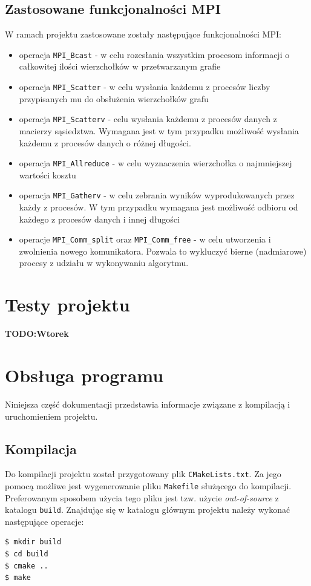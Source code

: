 \documentclass[12pt]{article}
\begin{document}
\subsection{Zastosowane funkcjonalności MPI}
W ramach projektu zastosowane zostały następujące funkcjonalności MPI:
\begin{itemize}
\item operacja \lstinline{MPI_Bcast} - w celu rozesłania wszystkim procesom informacji o całkowitej ilości wierzchołków w przetwarzanym grafie
\item operacja \lstinline{MPI_Scatter} - w celu wysłania każdemu z procesów liczby przypisanych mu do obsłużenia wierzchołków grafu
\item operacja \lstinline{MPI_Scatterv} - celu wysłania każdemu z procesów danych z macierzy sąsiedztwa. Wymagana jest w tym przypadku możliwość wysłania każdemu z procesów danych o różnej długości.
\item operacja \lstinline{MPI_Allreduce} - w celu wyznaczenia wierzchołka o najmniejszej wartości kosztu
\item operacja \lstinline{MPI_Gatherv} - w celu zebrania wyników wyprodukowanych przez każdy z procesów. W tym przypadku wymagana jest możliwość odbioru od każdego z procesów danych i innej długości
\item operacje \lstinline{MPI_Comm_split} oraz \lstinline{MPI_Comm_free} - w celu utworzenia i zwolnienia nowego komunikatora. Pozwala to wykluczyć bierne (nadmiarowe) procesy z udziału w wykonywaniu algorytmu.
\end{itemize}

\section{Testy projektu}
\textbf{TODO:Wtorek}

\newpage
\section{Obsługa programu}
Niniejsza część dokumentacji przedstawia informacje związane z kompilacją i uruchomieniem projektu.

\subsection{Kompilacja}
Do kompilacji projektu został przygotowany plik \lstinline|CMakeLists.txt|. Za jego pomocą możliwe jest wygenerowanie pliku \lstinline{Makefile} służącego do kompilacji. Preferowanym sposobem użycia tego pliku jest tzw. użycie \textit{out-of-source} z katalogu \lstinline{build}. Znajdując się w katalogu głównym projektu należy wykonać następujące operacje:
\begin{lstlisting}
$ mkdir build
$ cd build
$ cmake ..
$ make
\end{lstlisting}
\end{document}

